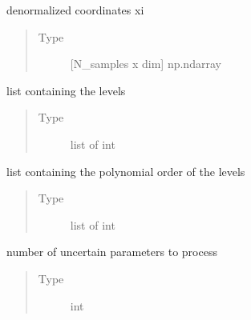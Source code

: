 \documentclass[letterpaper,10pt,english,openany,oneside]{sphinxmanual}
\begin{document}
\begin{fulllineitems}
\begin{fulllineitems}
\label{\detokenize{pygpc:pygpc.grid.SparseGrid.coords}}
denormalized coordinates xi
\begin{quote}\begin{description}
\item[{Type}] \leavevmode
{[}N\_samples x dim{]} np.ndarray

\end{description}\end{quote}

\end{fulllineitems}


\begin{fulllineitems}
\label{\detokenize{pygpc:pygpc.grid.SparseGrid.level_sequence}}
list containing the levels
\begin{quote}\begin{description}
\item[{Type}] \leavevmode
list of int

\end{description}\end{quote}

\end{fulllineitems}


\begin{fulllineitems}
\label{\detokenize{pygpc:pygpc.grid.SparseGrid.order_sequence}}
list containing the polynomial order of the levels
\begin{quote}\begin{description}
\item[{Type}] \leavevmode
list of int

\end{description}\end{quote}

\end{fulllineitems}


\begin{fulllineitems}
\label{\detokenize{pygpc:pygpc.grid.SparseGrid.dim}}
number of uncertain parameters to process
\begin{quote}\begin{description}
\item[{Type}] \leavevmode
int


\end{description}
\end{quote}
\end{fulllineitems}
\end{fulllineitems}
\end{document}
